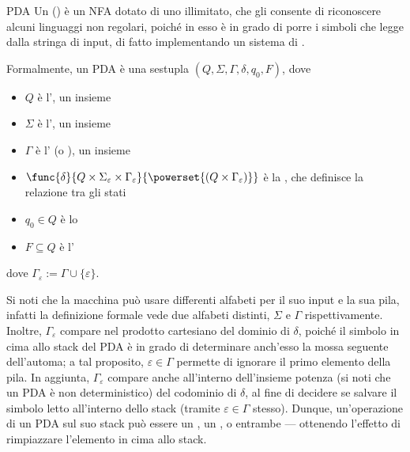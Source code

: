 \documentclass[a4paper, 12pt]{report}
\begin{document}
    \begin{frameddefn}{PDA}
        Un  () è un NFA dotato di uno  illimitato, che gli consente di riconoscere alcuni linguaggi non regolari, poiché in esso è in grado di porre i simboli che legge dalla stringa di input, di fatto implementando un sistema di .

        Formalmente, un PDA è una sestupla $(Q, \Sigma, \Gamma, \delta, q_0, F)$, dove

        \begin{itemize}
            \item $Q$ è l', un insieme 
            \item $\Sigma$ è l', un insieme 
            \item $\Gamma$ è l' (o ), un insieme 
            \item $\func{\delta}{Q \times \Sigma_\varepsilon \times \Gamma_\varepsilon}{\powerset{(Q \times \Gamma_\varepsilon)}}$ è la , che definisce la relazione tra gli stati
            \item $q_0 \in Q$ è lo 
            \item $F \subseteq Q$ è l'
        \end{itemize}

        dove $\Gamma_\varepsilon := \Gamma \cup \{ \varepsilon \}$.

        Si noti che la macchina può usare differenti alfabeti per il suo input e la sua pila, infatti la definizione formale vede due alfabeti distinti, $\Sigma$ e $\Gamma$ rispettivamente. Inoltre, $\Gamma_\varepsilon$ compare nel prodotto cartesiano del dominio di $\delta$, poiché il simbolo in cima allo stack del PDA è in grado di determinare anch'esso la mossa seguente dell'automa; a tal proposito, $\varepsilon \in \Gamma$ permette di ignorare il primo elemento della pila. In aggiunta, $\Gamma_\varepsilon$ compare anche all'interno dell'insieme potenza (si noti che un PDA è non deterministico) del codominio di $\delta$, al fine di decidere se salvare il simbolo letto all'interno dello stack  (tramite $\varepsilon \in \Gamma$ stesso). Dunque, un'operazione di un PDA sul suo stack può essere un , un , o entrambe --- ottenendo l'effetto di rimpiazzare l'elemento in cima allo stack.
    \end{frameddefn}
\end{document}
